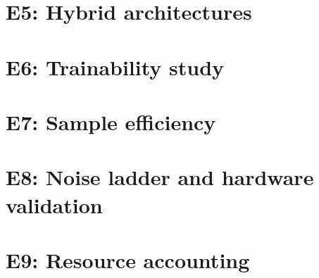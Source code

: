 \section{E5: Hybrid architectures}
\label{sec:exp-e5}

\section{E6: Trainability study}
\label{sec:exp-e6}

\section{E7: Sample efficiency}
\label{sec:exp-e7}

\section{E8: Noise ladder and hardware validation}
\label{sec:exp-e8}

\section{E9: Resource accounting}
\label{sec:exp-e9}
